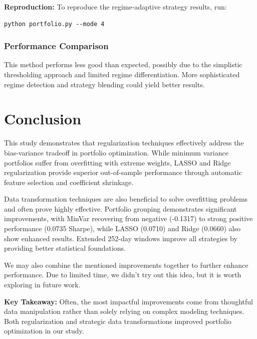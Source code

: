 \documentclass[12pt]{article}
\begin{document}
\textbf{Reproduction:}
To reproduce the regime-adaptive strategy results, run:
\begin{lstlisting}
python portfolio.py --mode 4
\end{lstlisting}

\subsubsection{Performance Comparison}
This method performs less good than expected, possibly due to the simplistic thresholding approach and limited regime differentiation. More sophisticated regime detection and strategy blending could yield better results.

\section{Conclusion}

This study demonstrates that regularization techniques effectively address the bias-variance tradeoff in portfolio optimization. While minimum variance portfolios suffer from overfitting with extreme weights, LASSO and Ridge regularization provide superior out-of-sample performance through automatic feature selection and coefficient shrinkage.

Data transformation techniques are also beneficial to solve overfitting problems and often prove highly effective. Portfolio grouping demonstrates significant improvements, with MinVar recovering from negative (-0.1317) to strong positive performance (0.0735 Sharpe), while LASSO (0.0710) and Ridge (0.0660) also show enhanced results. Extended 252-day windows improve all strategies by providing better statistical foundations.

We may also combine the mentioned improvements together to further enhance performance. Due to limited time, we didn't try out this idea, but it is worth exploring in future work.

\textbf{Key Takeaway:} Often, the most impactful improvements come from thoughtful data manipulation rather than solely relying on complex modeling techniques. Both regularization and strategic data transformations improved portfolio optimization in our study.
\end{document}
